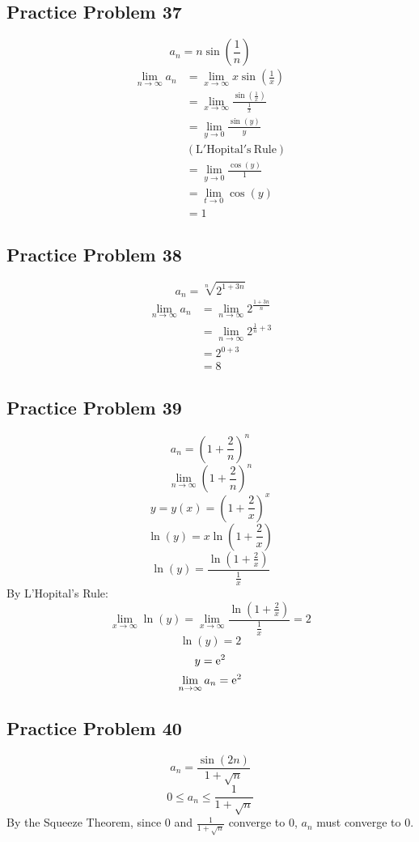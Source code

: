 \documentclass[letterpaper, 12pt]{math}
\begin{document}
\subsection*{Practice Problem 37}
\[ a_{n} = n\sin(\frac{1}{n}) \]
\begin{align*}
  \lim_{n\to\infty}{a_{n}} &= \lim_{x\to\infty}{x\sin(\frac{1}{x})} \\
  &= \lim_{x\to\infty}{\frac{\sin(\frac{1}{x})}{\frac{1}{x}}} \\
  &= \lim_{y\to0}{\frac{\sin(y)}{y}} \\
  & \mathrm{(L'Hopital's\ Rule)} \\
  &= \lim_{y\to0}{\frac{\cos(y)}{1}} \\
  &= \lim_{t\to0}{\cos(y)} \\
  &= 1
\end{align*}

\subsection*{Practice Problem 38}
\[ a_{n} = \sqrt[n]{2^{1+3n}} \]
\begin{align*}
  \lim_{n\to\infty}{a_{n}} &= \lim_{n\to\infty}{2^{\frac{1+3n}{n}}} \\
  &= \lim_{n\to\infty}{2^{\frac{1}{n}+3}} \\
  &= 2^{0+3} \\
  &= 8
\end{align*}

\subsection*{Practice Problem 39}
\[ a_{n} = (1+\frac{2}{n})^{n} \]
\[ \lim_{n\to\infty}{(1+\frac{2}{n})^{n}} \]
\[ y = y(x) = (1+\frac{2}{x})^{x} \]
\[ \ln(y) = x\ln(1+\frac{2}{x}) \]
\[ \ln(y) = \frac{\ln(1+\frac{2}{x})}{\frac{1}{x}} \]
By L'Hopital's Rule:
\[ \lim_{x\to\infty}{\ln(y)} =
   \lim_{x\to\infty}{\frac{\ln(1+\frac{2}{x})}{\frac{1}{x}}} = 2 \]
\[ \ln(y) = 2 \]
\[ y = \mathrm{e}^{2} \]
\[ \lim_{n\to\infty}{a_{n}} = \mathrm{e}^{2} \]

\subsection*{Practice Problem 40}
\[ a_{n} = \frac{\sin(2n)}{1+\sqrt{n}} \]
\[ 0 \leq a_{n} \leq \frac{1}{1+\sqrt{n}} \]
By the Squeeze Theorem, since 0 and \( \frac{1}{1+\sqrt{n}} \) converge to 0,
\( a_{n} \) must converge to 0.
\end{document}
